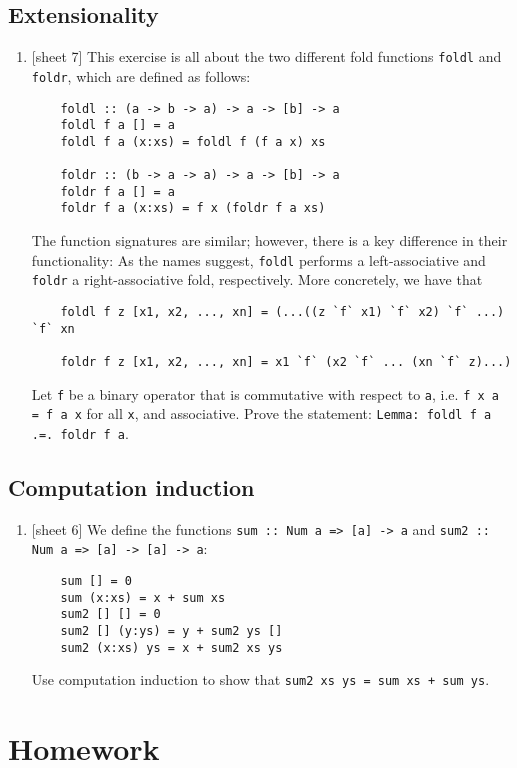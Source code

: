 \documentclass{article}
\def\code#1{\texttt{#1}}
\begin{document}
\subsection{Extensionality}
\begin{enumerate}
    \item {[sheet 7]} This exercise is all about the two different fold functions \code{foldl} and \code{foldr}, which are defined as follows:
        \begin{verbatim}
    foldl :: (a -> b -> a) -> a -> [b] -> a
    foldl f a [] = a
    foldl f a (x:xs) = foldl f (f a x) xs

    foldr :: (b -> a -> a) -> a -> [b] -> a
    foldr f a [] = a
    foldr f a (x:xs) = f x (foldr f a xs)
        \end{verbatim}
        The function signatures are similar; however, there is a key difference in their functionality: As the names suggest, \code{foldl} performs a left-associative and \code{foldr} a right-associative fold, respectively. More concretely, we have that
        \begin{verbatim}
    foldl f z [x1, x2, ..., xn] = (...((z `f` x1) `f` x2) `f` ...) `f` xn

    foldr f z [x1, x2, ..., xn] = x1 `f` (x2 `f` ... (xn `f` z)...)
        \end{verbatim}
        Let \code{f} be a binary operator that is commutative with respect to \code{a}, i.e. \code{f x a = f a x} for all \code{x}, and associative. Prove the statement: \code{Lemma: foldl f a .=. foldr f a}.
\end{enumerate}

\subsection{Computation induction}
\begin{enumerate}
    \item {[sheet 6]} We define the functions \code{sum :: Num a => [a] -> a} and \code{sum2 :: Num a => [a] -> [a] -> a}:
        \begin{verbatim}
    sum [] = 0
    sum (x:xs) = x + sum xs
    sum2 [] [] = 0
    sum2 [] (y:ys) = y + sum2 ys []
    sum2 (x:xs) ys = x + sum2 xs ys
        \end{verbatim}
        Use computation induction to show that \code{sum2 xs ys = sum xs + sum ys}.
\end{enumerate}

\section{Homework}
\end{document}

